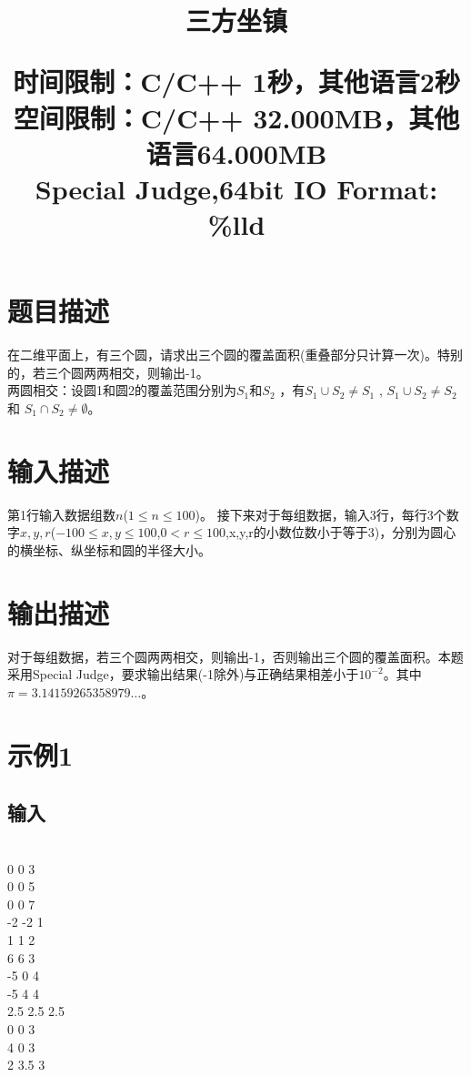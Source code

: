 \documentclass{article}
\date{}
\title{三方坐镇 \\ [2ex] \begin{large} 
	时间限制：C/C++ 1秒，其他语言2秒 \\
	空间限制：C/C++ 32.000MB，其他语言64.000MB 	\\
	Special Judge,64bit IO Format: \%lld
 			\end{large} }
\begin{document}
		\maketitle \vspace{-50pt}
		
		\section*{题目描述}
		\indent 在二维平面上，有三个圆，请求出三个圆的覆盖面积(重叠部分只计算一次)。特别的，若三个圆两两相交，则输出-1。\\
		\indent 两圆相交：设圆1和圆2的覆盖范围分别为$S_{1}$和$S_{2}$ ，有$S_{1}\cup S_{2} \neq S_{1}$ ,  $S_{1}\cup S_{2} \neq S_{2}$ 和 $S_{1}\cap S_{2} \neq \emptyset $。

		\section*{输入描述}
			\noindent 第1行输入数据组数$n$($1 \le n \le 100$)。
			接下来对于每组数据，输入3行，每行$3$个数字$x,y,r$($-100 \le x,y \le 100$,$0 < r \le 100$,x,y,r的小数位数小于等于3)，分别为圆心的横坐标、纵坐标和圆的半径大小。 

		\section*{输出描述}
			\noindent 对于每组数据，若三个圆两两相交，则输出-1，否则输出三个圆的覆盖面积。本题采用Special Judge，要求输出结果(-1除外)与正确结果相差小于$10^{-2}$。其中$\pi=3.14159265358979\dots$。
			
		\section*{示例1}
			\subsection*{输入}
	\\
0 0 3	\\
0 0 5	\\
0 0 7	\\
-2 -2 1	\\
1 1 2	\\
6 6 3	\\
-5 0 4	\\
-5 4 4	\\	
2.5 2.5 2.5	\\
0 0 3	\\
4 0 3	\\
2 3.5 3
\end{document}
